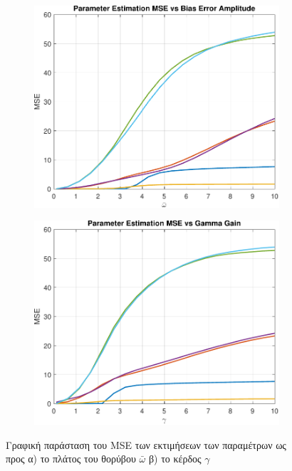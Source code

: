 \documentclass[a4paper,12pt]{article}
\begin{document}
\begin{figure}[htbp]
  \centering
  \begin{subfigure}[b]{0.45\textwidth}
    \centering
    \includegraphics[width=\textwidth]{plot/task1_mse_vs_bias_error_amplitude.pdf}
    \caption{}
    \label{fig:task1_mse_vs_bias_error_amplitude}
  \end{subfigure}
  \hfill
  \begin{subfigure}[b]{0.45\textwidth}
    \centering
    \includegraphics[width=\textwidth]{plot/task1_mse_vs_gamma_gain.pdf}
    \caption{}
    \label{fig:task1_mse_vs_gamma_gain}
  \end{subfigure}
  \caption{Γραφική παράσταση του MSE των εκτιμήσεων των
    παραμέτρων ως προς α) το πλάτος του θορύβου $\bar{\omega}$ β) το κέρδος $\gamma$}
  \label{fig:task1_mse_vs_design_parameters}
\end{figure}
\end{document}
